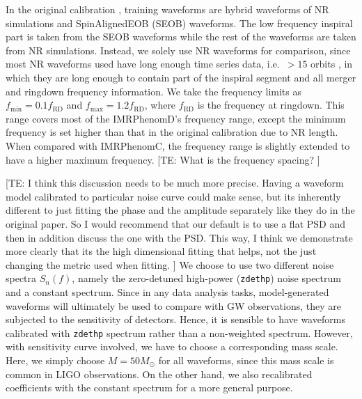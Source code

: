 \documentclass[twocolumn]{aastex631}
\newcommand{\te}[1]{{\color{rr}[TE: #1 ]}}
\newcommand{\zdethp}{\texttt{zdethp}}
\begin{document}
In the original calibration \citep{khan2016frequency,husa2016frequency}, training waveforms are hybrid waveforms of NR simulations and SpinAlignedEOB (SEOB) waveforms. The low frequency inspiral part is taken from the SEOB waveforms while the rest of the waveforms are taken from NR simulations. Instead, we solely use NR waveforms for comparison, since most NR waveforms used have long enough time series data, i.e.~$>15$ orbits \citep{boyle2019sxs}, in which they are long enough to contain part of the inspiral segment and all merger and ringdown frequency information. We take the frequency limits as $f_{\mathrm{min}}=0.1f_{\mathrm{RD}}$ and $f_{\mathrm{max}}=1.2f_{\mathrm{RD}}$, where $f_{\mathrm{RD}}$ is the frequency at ringdown. This range covers most of the IMRPhenomD's frequency range, except the minimum frequency is set higher than that in the original calibration due to NR length. When compared with IMRPhenomC, the frequency range is slightly extended to have a higher maximum frequency. \te{What is the frequency spacing?}

\te{I think this discussion needs to be much more precise. Having a waveform model calibrated to particular noise curve could make sense, but its inherently different to just fitting the phase and the amplitude separately like they do in the original paper. So I would recommend that our default is to use a flat PSD and then in addition discuss the one with the PSD. This way, I think we demonstrate more clearly that its the high dimensional fitting that helps, not the just changing the metric used when fitting.}
We choose to use two different noise spectra $S_n(f)$, namely the zero-detuned high-power (\zdethp) noise spectrum and a constant spectrum. Since in any data analysis tasks, model-generated waveforms will ultimately be used to compare with GW observations, they are subjected to the sensitivity of detectors. Hence, it is sensible to have waveforms calibrated with {\zdethp} spectrum rather than a non-weighted spectrum. However, with sensitivity curve involved, we have to choose a corresponding mass scale. Here, we simply choose $M=50M_{\odot}$ for all waveforms, since this mass scale is common in LIGO observations. On the other hand, we also recalibrated coefficients with the constant spectrum for a more general purpose. 
\end{document}

